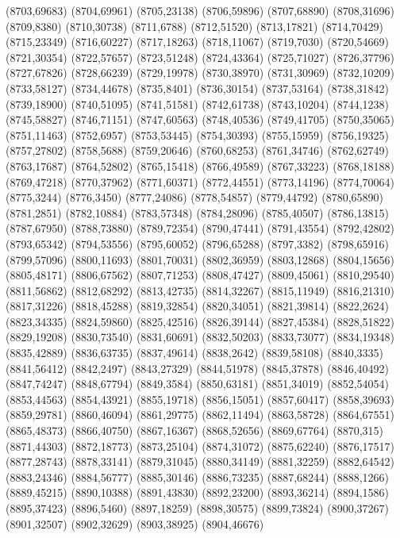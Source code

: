 (8703,69683)
(8704,69961)
(8705,23138)
(8706,59896)
(8707,68890)
(8708,31696)
(8709,8380)
(8710,30738)
(8711,6788)
(8712,51520)
(8713,17821)
(8714,70429)
(8715,23349)
(8716,60227)
(8717,18263)
(8718,11067)
(8719,7030)
(8720,54669)
(8721,30354)
(8722,57657)
(8723,51248)
(8724,43364)
(8725,71027)
(8726,37796)
(8727,67826)
(8728,66239)
(8729,19978)
(8730,38970)
(8731,30969)
(8732,10209)
(8733,58127)
(8734,44678)
(8735,8401)
(8736,30154)
(8737,53164)
(8738,31842)
(8739,18900)
(8740,51095)
(8741,51581)
(8742,61738)
(8743,10204)
(8744,1238)
(8745,58827)
(8746,71151)
(8747,60563)
(8748,40536)
(8749,41705)
(8750,35065)
(8751,11463)
(8752,6957)
(8753,53445)
(8754,30393)
(8755,15959)
(8756,19325)
(8757,27802)
(8758,5688)
(8759,20646)
(8760,68253)
(8761,34746)
(8762,62749)
(8763,17687)
(8764,52802)
(8765,15418)
(8766,49589)
(8767,33223)
(8768,18188)
(8769,47218)
(8770,37962)
(8771,60371)
(8772,44551)
(8773,14196)
(8774,70064)
(8775,3244)
(8776,3450)
(8777,24086)
(8778,54857)
(8779,44792)
(8780,65890)
(8781,2851)
(8782,10884)
(8783,57348)
(8784,28096)
(8785,40507)
(8786,13815)
(8787,67950)
(8788,73880)
(8789,72354)
(8790,47441)
(8791,43554)
(8792,42802)
(8793,65342)
(8794,53556)
(8795,60052)
(8796,65288)
(8797,3382)
(8798,65916)
(8799,57096)
(8800,11693)
(8801,70031)
(8802,36959)
(8803,12868)
(8804,15656)
(8805,48171)
(8806,67562)
(8807,71253)
(8808,47427)
(8809,45061)
(8810,29540)
(8811,56862)
(8812,68292)
(8813,42735)
(8814,32267)
(8815,11949)
(8816,21310)
(8817,31226)
(8818,45288)
(8819,32854)
(8820,34051)
(8821,39814)
(8822,2624)
(8823,34335)
(8824,59860)
(8825,42516)
(8826,39144)
(8827,45384)
(8828,51822)
(8829,19208)
(8830,73540)
(8831,60691)
(8832,50203)
(8833,73077)
(8834,19348)
(8835,42889)
(8836,63735)
(8837,49614)
(8838,2642)
(8839,58108)
(8840,3335)
(8841,56412)
(8842,2497)
(8843,27329)
(8844,51978)
(8845,37878)
(8846,40492)
(8847,74247)
(8848,67794)
(8849,3584)
(8850,63181)
(8851,34019)
(8852,54054)
(8853,44563)
(8854,43921)
(8855,19718)
(8856,15051)
(8857,60417)
(8858,39693)
(8859,29781)
(8860,46094)
(8861,29775)
(8862,11494)
(8863,58728)
(8864,67551)
(8865,48373)
(8866,40750)
(8867,16367)
(8868,52656)
(8869,67764)
(8870,315)
(8871,44303)
(8872,18773)
(8873,25104)
(8874,31072)
(8875,62240)
(8876,17517)
(8877,28743)
(8878,33141)
(8879,31045)
(8880,34149)
(8881,32259)
(8882,64542)
(8883,24346)
(8884,56777)
(8885,30146)
(8886,73235)
(8887,68244)
(8888,1266)
(8889,45215)
(8890,10388)
(8891,43830)
(8892,23200)
(8893,36214)
(8894,1586)
(8895,37423)
(8896,5460)
(8897,18259)
(8898,30575)
(8899,73824)
(8900,37267)
(8901,32507)
(8902,32629)
(8903,38925)
(8904,46676)
